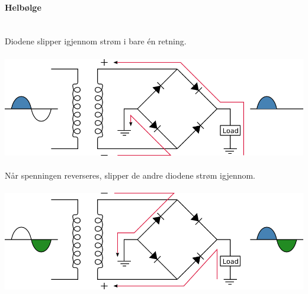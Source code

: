\paragraph{Helbølge} \mbox{} \\
Diodene slipper igjennom strøm i bare én retning.
\\\\
\includegraphics[width=\textwidth]{./img/likeretter}
\\\\
Når spenningen reverseres, slipper de andre diodene strøm igjennom.
\\\\
\includegraphics[width=\textwidth]{./img/likeretter-rev}
